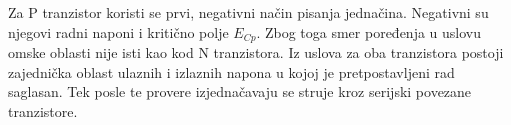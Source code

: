Za P tranzistor koristi se prvi, negativni način pisanja jednačina. Negativni su njegovi radni naponi i kritično polje $E_{Cp}$. Zbog toga smer poređenja u uslovu omske oblasti nije isti kao kod N tranzistora. Iz uslova za oba tranzistora postoji zajednička oblast ulaznih i izlaznih napona u kojoj je pretpostavljeni rad saglasan. Tek posle te provere izjednačavaju se struje kroz serijski povezane tranzistore.
